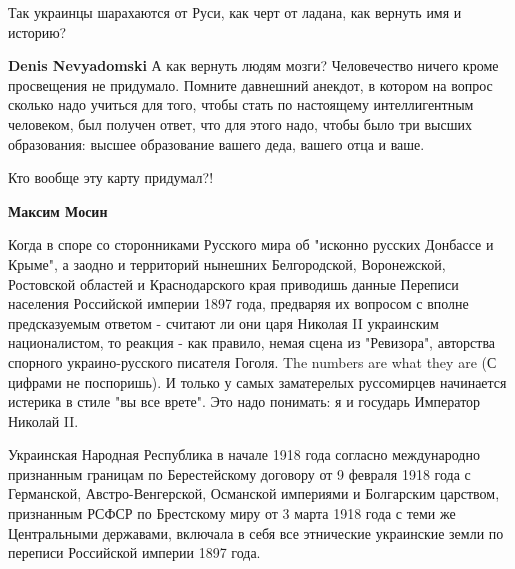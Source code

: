 \begin{itemize}
Так украинцы шарахаются от Руси, как черт от ладана, как вернуть имя и историю?

\begin{itemize}
 
\textbf{Denis Nevyadomski} А как вернуть людям мозги? Человечество ничего кроме
просвещения не придумало. Помните давнешний анекдот, в котором на вопрос
сколько надо учиться для того, чтобы стать по настоящему интеллигентным
человеком, был получен ответ, что для этого надо, чтобы было три высших
образования: высшее образование вашего деда, вашего отца и ваше.
\end{itemize}

 
Кто вообще эту карту придумал?!

\begin{itemize}
 
\textbf{Максим Мосин} 

Когда в споре со сторонниками Русского мира об "исконно русских Донбассе и
Крыме", а заодно и территорий нынешних Белгородской, Воронежской, Ростовской
областей и Краснодарского края приводишь данные Переписи населения Российской
империи 1897 года, предваряя их вопросом с вполне предсказуемым ответом -
считают ли они царя Николая II украинским националистом, то реакция - как
правило, немая сцена из "Ревизора", авторства спорного украино-русского
писателя Гоголя. The numbers are what they are (С цифрами не поспоришь). И
только у самых заматерелых руссомирцев начинается истерика в стиле "вы все
врете". Это надо понимать: я и государь Император Николай II.

Украинская Народная Республика в начале 1918 года согласно международно
признанным границам по Берестейскому договору от 9 февраля 1918 года с
Германской, Австро-Венгерской, Османской империями и Болгарским царством,
признанным РСФСР по Брестскому миру от 3 марта 1918 года с теми же Центральными
державами, включала в себя все этнические украинские земли по переписи
Российской империи 1897 года.


\end{itemize}
\end{itemize}
